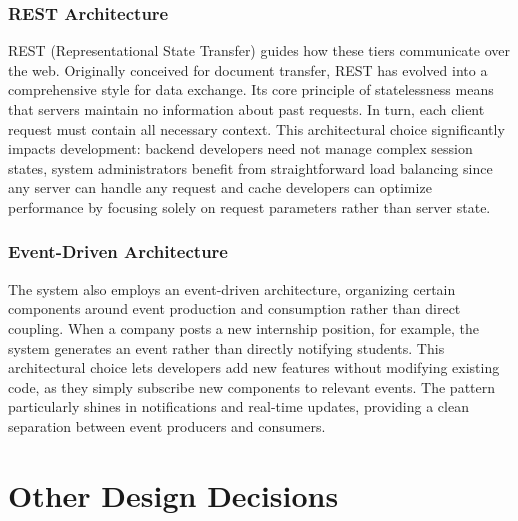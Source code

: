 \subsubsection{REST Architecture}
REST (Representational State Transfer) guides how these tiers communicate over the web.
Originally conceived for document transfer, REST has evolved into a comprehensive style for data exchange.
Its core principle of statelessness means that servers maintain no information about past requests.
In turn, each client request must contain all necessary context.
This architectural choice significantly impacts development: backend developers need not manage complex session states, system administrators benefit from straightforward load balancing since any server can handle any request and cache developers can optimize performance by focusing solely on request parameters rather than server state.

\subsubsection{Event-Driven Architecture}
The system also employs an event-driven architecture, organizing certain components around event production and consumption rather than direct coupling.
When a company posts a new internship position, for example, the system generates an event rather than directly notifying students.
This architectural choice lets developers add new features without modifying existing code, as they simply subscribe new components to relevant events.
The pattern particularly shines in notifications and real-time updates, providing a clean separation between event producers and consumers.

\section{Other Design Decisions}
